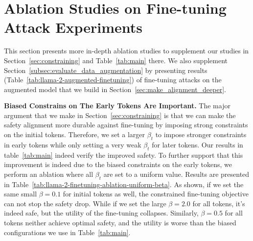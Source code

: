 \section{Ablation Studies on Fine-tuning Attack Experiments}
\label{appendix:finetuning_ablation}

This section presents more in-depth ablation studies to supplement our studies in Section~\ref{sec:constraining} and Table~\ref{tab:main} there. We also supplement Section~\ref{subsec:evaluate_data_augmentation} by presenting results (Table~\ref{tab:llama-2-augmented-finetuning}) of fine-tuning attacks on the augmented model that we build in Section~\ref{sec:make_alignment_deeper}.

\textbf{Biased Constrains on The Early Tokens Are Important.} The major argument that we make in Section~\ref{sec:constraining} is that we can make the safety alignment more durable against fine-tuning by imposing strong constraints on the initial tokens. Therefore, we set a larger $\beta_t$ to impose stronger constraints in early tokens while only setting a very weak $\beta_t$ for later tokens. Our results in table~\ref{tab:main} indeed verify the improved safety. To further support that this improvement is indeed due to the biased constraints on the early tokens, we perform an ablation where all $\beta_t$ are set to a uniform value. Results are presented in Table~\ref{tab:llama-2-finetuning-ablation-uniform-beta}. As shown, if we set the same small $\beta = 0.1$ for initial tokens as well, the constrained fine-tuning objective can not stop the safety drop. While if we set the large $\beta = 2.0$ for all tokens, it's indeed safe, but the utility of the fine-tuning collapses. Similarly, $\beta = 0.5$ for all tokens neither achieve optimal safety, and the utility is worse than the biased configurations we use in Table~\ref{tab:main}.

